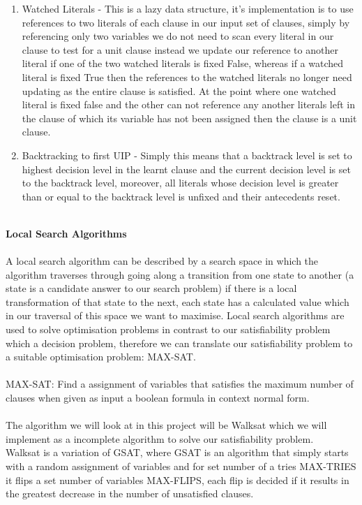 \documentclass[12pt,a4paper]{article}
\begin{document}
\begin{enumerate}
{}
\item{Watched Literals \cite{chaff}- This is a lazy data structure, it's implementation is to use references to two literals of each clause in our input set of clauses, simply by referencing only two variables we do not need to scan every literal in our clause to test for a unit clause instead we update our reference to another literal if one of the two watched literals is fixed False, whereas if a watched literal is fixed True then the references to the watched literals no longer need updating as the entire clause is satisfied. At the point where one watched literal is fixed false and the other can not reference any another literals left in the clause of which its variable has not been assigned then the clause is a unit clause.
}
\item{Backtracking to first UIP \cite{firstUIPbacktrack} - Simply this means that a backtrack level is set to highest decision level in the learnt clause and the current decision level is set to the backtrack level, moreover, all literals whose decision level is greater than or equal to the backtrack level is unfixed and their antecedents reset.}

\end{enumerate}
\hfill\\
{\bf Local Search Algorithms}\\\\
A local search algorithm can be described by a search space in which the algorithm traverses through going along a transition from one state to another (a state is a candidate answer to our search problem) if there is a local transformation of that state to the next, each state has a calculated value which in our traversal of this space we want to maximise.
Local search algorithms are used to solve optimisation problems in contrast to our satisfiability problem which a decision problem, therefore we can translate our satisfiability problem to a suitable optimisation problem: MAX-SAT.\\\\
MAX-SAT: Find a assignment of variables that satisfies the maximum number of clauses when given as input a boolean formula in context normal form.\\\\
The algorithm we will look at in this project will be Walksat \cite{WalkSat} which we will implement as a incomplete algorithm to solve our satisfiability problem.\\
Walksat is a variation of GSAT, where GSAT is an algorithm that simply starts with a random assignment of variables and for set number of a tries MAX-TRIES it flips a set number of variables MAX-FLIPS, each flip is decided if it results in the greatest decrease in the number of unsatisfied clauses.\\
\end{document}
